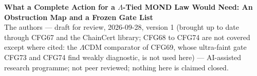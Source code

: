 \documentclass[10pt]{article}
\begin{document}
\begin{center}
{\Large\bfseries What a Complete Action for a $\Lambda$-Tied MOND Law Would Need: An Obstruction Map and a Frozen Gate List}\\[6pt]
{\small The authors --- draft for review, 2026-09-28, version 1 (brought up to date through CFG67 and the ChainCert library; CFG68 to CFG74 are not covered except where cited: the $\Lambda$CDM comparator of CFG69, whose ultra-faint gate CFG73 and CFG74 find weakly diagnostic, is not used here) --- AI-assisted research programme; not peer reviewed; nothing here is claimed closed.}
\end{center}

\end{document}
